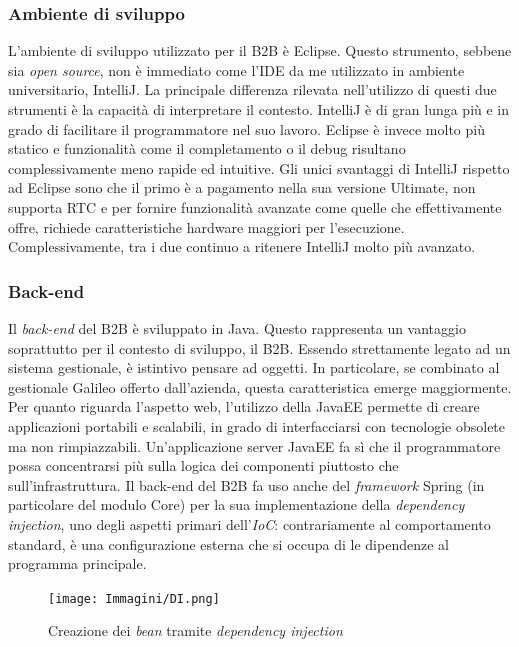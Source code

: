 \subsubsection{Ambiente di sviluppo}
L'ambiente di sviluppo utilizzato per il B2B è Eclipse. Questo strumento, sebbene sia \textit{open source}, non è immediato come l'IDE da me utilizzato in ambiente universitario, IntelliJ. La principale differenza rilevata nell'utilizzo di questi due strumenti è la capacità di interpretare il contesto. IntelliJ è di gran lunga più  e in grado di facilitare il programmatore nel suo lavoro. Eclipse è invece molto più statico e funzionalità come il completamento o il debug risultano complessivamente meno rapide ed intuitive. Gli unici svantaggi di IntelliJ rispetto ad Eclipse sono che il primo è a pagamento nella sua versione Ultimate, non supporta RTC e per fornire funzionalità avanzate come quelle che effettivamente offre, richiede caratteristiche hardware maggiori per l'esecuzione. Complessivamente, tra i due continuo a ritenere IntelliJ molto più avanzato.

\subsubsection{Back-end}
Il \textit{back-end} del B2B è sviluppato in Java. Questo rappresenta un vantaggio soprattutto per il contesto di sviluppo, il B2B. Essendo strettamente legato ad un sistema gestionale, è istintivo pensare ad oggetti. In particolare, se combinato al gestionale Galileo offerto dall'azienda, questa caratteristica emerge maggiormente. Per quanto riguarda l'aspetto web, l'utilizzo della JavaEE permette di creare applicazioni portabili e scalabili, in grado di interfacciarsi con tecnologie obsolete ma non rimpiazzabili. Un'applicazione server JavaEE fa sì che il programmatore possa concentrarsi più sulla logica dei componenti piuttosto che sull'infrastruttura. Il back-end del B2B fa uso anche del \textit{framework} Spring (in particolare del modulo Core) per la sua implementazione della \textit{dependency injection}, uno degli aspetti primari dell'\textit{\Gls{IoC}}: contrariamente al comportamento standard, è una configurazione esterna che si occupa di  le dipendenze al programma principale.

\begin{figure}[H]
	\centering
	\texttt{[image: Immagini/DI.png]}
	\caption{Creazione dei \textit{bean} tramite \textit{dependency injection}}
\end{figure}

